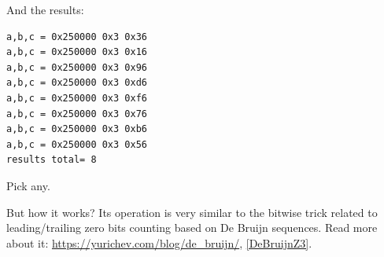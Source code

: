 And the results:

\begin{lstlisting}
a,b,c = 0x250000 0x3 0x36
a,b,c = 0x250000 0x3 0x16
a,b,c = 0x250000 0x3 0x96
a,b,c = 0x250000 0x3 0xd6
a,b,c = 0x250000 0x3 0xf6
a,b,c = 0x250000 0x3 0x76
a,b,c = 0x250000 0x3 0xb6
a,b,c = 0x250000 0x3 0x56
results total= 8
\end{lstlisting}

Pick any.

But how it works?
Its operation is very similar to the bitwise trick related to leading/trailing zero bits counting based on De Bruijn sequences.
Read more about it:
\url{https://yurichev.com/blog/de_bruijn/},
\ref{DeBruijnZ3}.

